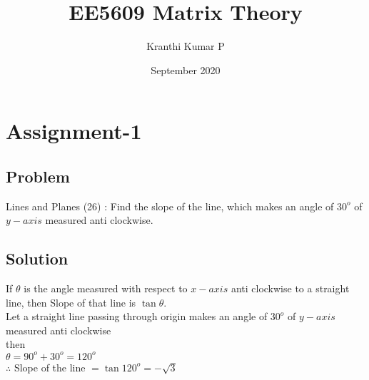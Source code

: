 \documentclass[12pt]{article}
\title{EE5609 Matrix Theory}
\author{Kranthi Kumar P}
\date{September 2020}
\begin{document}
\maketitle

\section{Assignment-1}
\subsection{Problem}
Lines and Planes (26) : Find the slope of the line, which makes an angle of $30^o$ of $y-axis$ measured anti clockwise.
\subsection{Solution}
If $\theta$ is the angle measured with respect to $x-axis$ anti clockwise to a straight line, then Slope of that line is $\tan\theta$.\\[6pt]

Let a straight line passing through origin makes an angle of $30^o$ of $y-axis$ measured anti clockwise\\[6pt]
then\\[6pt]
$\theta = 90^o + 30^o = 120^o$\\[6pt]
$\therefore$ Slope of the line $=\tan 120^o = -\sqrt{3} $
\end{document}
